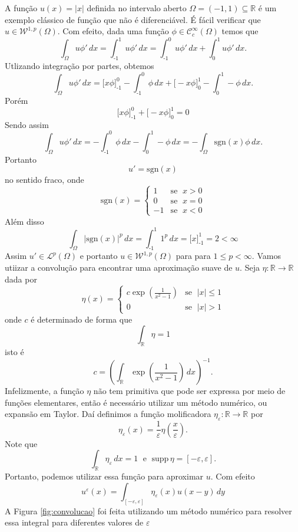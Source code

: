 \documentclass[a4paper, 11pt]{book}
\theoremstyle{definition}
\newcommand{\bR}{\mathbb{R}}
\newcommand{\cC}{\mathcal{C}}
\newcommand{\cL}{\mathcal{L}}
\newcommand{\cW}{\mathcal{W}}
\newcommand{\supp}{\mathrm{supp}\,}
\newcommand{\sgn}{\mathrm{sgn}}
\begin{document}
\begin{ex}
    A função $u(x) = |x|$ definida no intervalo aberto $\Omega = (-1,1) \subseteq \bR$ é um exemplo clássico de função que não é diferenciável. É fácil verificar que $u \in \cW^{1,p}(\Omega)$. Com efeito, dada uma função $\phi \in \cC^\infty_c(\Omega)$ temos que
    \[
        \int_\Omega u \phi' \,dx = \int_{\text{-}1}^1 u \phi' \,dx = \int_{\text{-}1}^0 u \phi' \,dx + \int_0^1 u \phi' \,dx.
    \]
    Utlizando integração por partes, obtemos
    \[
        \int_\Omega u \phi'\,dx = \bigg[ x\phi \bigg]_{\text{-}1}^0 - \int_{\text{-}1}^0 \phi \,dx + \bigg[ -x \phi \bigg]_0^1 - \int_0^1 -\phi \,dx.
    \]
    Porém
    \[
       \bigg[ x\phi \bigg]_{\text{-}1}^0 + \bigg[ -x \phi \bigg]_0^1 = 0
    \]
    Sendo assim
    \[
        \int_\Omega u \phi'\,dx = - \int_{\text{-}1}^0 \phi \,dx - \int_0^1 -\phi \,dx = -\int_\Omega \sgn(x)\phi \,dx.
    \]
    Portanto
    \[
        u'= \sgn(x)
    \]
    no sentido fraco, onde
    \[
        \sgn(x) = 
        \left\{ 
            \begin{array}{rr}
                1 & \text{se }\; x > 0\\
                0 & \text{se }\; x = 0\\
                -1& \text{se }\; x < 0
            \end{array}
        \right.
    \]
    Além disso
    \[
        \int_\Omega |\sgn(x)|^p \,dx = \int_{\text{-}1}^1 1^p \,dx = \bigg[ x \bigg]^1_{\text{-}1} = 2 < \infty
    \]
    Assim $u'\in \cL^p(\Omega)$ e portanto $u \in \cW^{1,p}(\Omega)$ para para $1 \leqslant p < \infty$.
    Vamos utiizar a convolução para encontrar uma aproximação suave de $u$. 
    Seja $\eta : \bR \to \bR$ dada por
    \[
        \eta(x) = \left\{ 
            \begin{array}{lr}
                c \exp\left(\frac{1}{x^2 - 1} \right) & \text{se }\; |x| \leqslant 1\\
                0 & \text{se }\; |x| > 1
            \end{array}
        \right.
    \]
    onde $c$ é determinado de forma que
    \[
        \int_{\bR} \eta = 1
    \]
    isto é
    \[
        c = \left( \int_\bR \exp \left(\frac{1}{x^2 - 1} \right) \, dx\right)^{-1}.
    \]
    Infelizmente, a função $\eta$ não tem primitiva que pode ser expressa por meio de funções elementares, então é necessário utilizar um método numérico, ou expansão em Taylor.
    Daí definimos a função molificadora $\eta_\varepsilon : \bR \to \bR$ por
    \[
        \eta_\varepsilon(x) = \frac{1}{\varepsilon} \eta\left( \frac{x}{\varepsilon} \right).
    \]
    Note que
    \[
        \int_\bR \eta_\varepsilon \, dx = 1 \;\text{ e }\; \supp \eta = [-\varepsilon,\varepsilon].
    \]
    Portanto, podemos utilizar essa função para aproximar $u$. Com efeito
    \[
        u^\varepsilon(x) = \int_{[-\varepsilon,\varepsilon]} \eta_\varepsilon(x) u(x-y) \,dy
    \]
    A Figura \ref{fig:convolucao} foi feita utilizando um método numérico para resolver essa integral para diferentes valores de $\varepsilon$ 


\end{ex}
\end{document}
